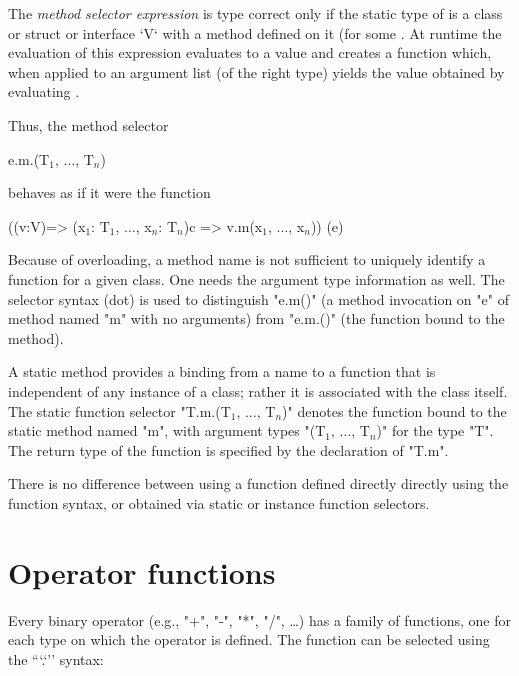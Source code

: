 The \emph{method selector expression}  is type
correct only if  the static type of  is a
class or struct or interface \xcd`V` with a method
 defined on it (for some
. At runtime the evaluation of this expression
evaluates  to a value  and creates a function 
which, when applied to an argument list  (of the right
type) yields the value obtained by evaluating .

Thus, the method selector

\begin{xtenmath}
e.m.(T$_1$, $\dots$, T$_n$)
\end{xtenmath}
\noindent behaves as if it were the function
\begin{xtenmath}
((v:V)=>
  (x$_1$: T$_1$, $\dots$, x$_n$: T$_n$){c} 
  => v.m(x$_1$, $\dots$, x$_n$))
(e)
\end{xtenmath}



Because of overloading, a method name is not sufficient to
uniquely identify a function for a given class.
One needs the argument type information as well.
The selector syntax (dot) is used to distinguish \xcd"e.m()" (a
method invocation on \xcd"e" of method named \xcd"m" with no arguments)
from \xcd"e.m.()"
(the function bound to the method). 

A static method provides a binding from a name to a function that is
independent of any instance of a class; rather it is associated with the
class itself. The static function selector
\xcdmath"T.m.(T$_1$, $\dots$, T$_n$)" denotes the
function bound to the static method named \xcd"m", with argument types
\xcdmath"(T$_1$, $\dots$, T$_n$)" for the type \xcd"T". The return type
of the function is specified by the declaration of \xcd"T.m".

There is no difference between using a function defined directly 
directly using the function syntax, or obtained via static or
instance function selectors.


\section{Operator functions}
\label{OperatorFunction}
Every binary operator (e.g.,
\xcd"+",
\xcd"-",
\xcd"*",
\xcd"/",
\dots) has a family of functions, one for
each type on which the operator is defined. The function can be
selected using the ``\xcd`.`'' syntax:


